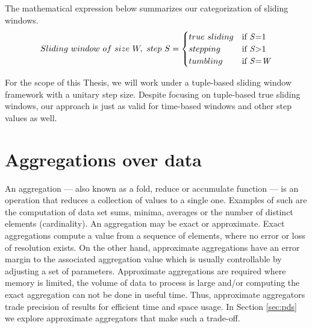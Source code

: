 The mathematical expression below summarizes our categorization of sliding windows.
\begin{equation} 
\label{math:windows}
  Sliding\ window \,\, of \,\, size \,\, W, \,\, step \,\, S =
    \begin{cases}
      true \,\, sliding & \text{if \textit{S}=1}\\
      stepping & \text{if \textit{S}>1}\\
      tumbling & \text{if \textit{S}=\textit{W}}
    \end{cases}
\end{equation}

For the scope of this Thesis, we will work under a tuple-based sliding window framework with a unitary step size. Despite focusing on tuple-based true sliding windows, our approach is just as valid for time-based windows and other step values as well.

\section{Aggregations over data} \label{sec:aggregations}

An aggregation --- also known as a fold, reduce or accumulate function --- is an operation that reduces a collection of values to a single one. Examples of such are the computation of data set sums, minima, averages or the number of distinct elements (cardinality). An aggregation may be exact or approximate. Exact aggregations compute a value from a sequence of elements, where no error or loss of resolution exists. On the other hand, approximate aggregations have an error margin to the associated aggregation value which is usually controllable by adjusting a set of parameters. 
Approximate aggregations are required where memory is limited, the volume of data to process is large and/or computing the exact aggregation can not be done in useful time. Thus, approximate aggregators trade precision of results for efficient time and space usage. In Section \ref{sec:pds} we explore approximate aggregators that make such a trade-off.

